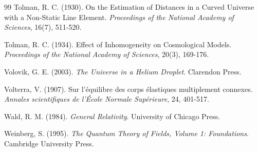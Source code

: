\begin{thebibliography}{99}
Tolman, R. C. (1930). On the Estimation of Distances in a Curved Universe with a Non-Static Line Element. \textit{Proceedings of the National Academy of Sciences}, 16(7), 511-520.

Tolman, R. C. (1934). Effect of Inhomogeneity on Cosmological Models. \textit{Proceedings of the National Academy of Sciences}, 20(3), 169-176.

Volovik, G. E. (2003). \textit{The Universe in a Helium Droplet}. Clarendon Press.

Volterra, V. (1907). Sur l'\'equilibre des corps \'elastiques multiplement connexes. \textit{Annales scientifiques de l'\'Ecole Normale Sup\'erieure}, 24, 401-517.

Wald, R. M. (1984). \textit{General Relativity}. University of Chicago Press.

Weinberg, S. (1995). \textit{The Quantum Theory of Fields, Volume 1: Foundations}. Cambridge University Press.

\end{thebibliography}




